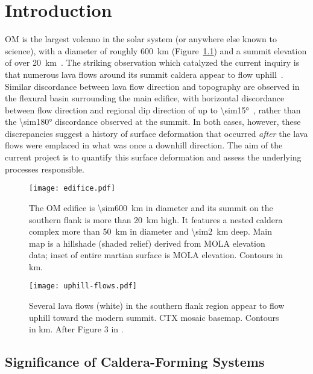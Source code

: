 \chapter{Introduction}
\ac{OM} is the largest volcano in the solar system (or anywhere else known to science), with a diameter of roughly \qty{600}{\km} (Figure~\ref{fig:edifice}) and a summit elevation of over \qty{20}{\km}~\parencite{plescia_morphometric_2004}. The striking observation which catalyzed the current inquiry is that numerous lava flows around its summit caldera appear to flow uphill~\parencite[Figure~\ref{fig:uphill-flows}; after][]{mouginis-mark_late-stage_2019}. Similar discordance between lava flow direction and topography are observed in the flexural basin surrounding the main edifice, with horizontal discordance between flow direction and regional dip direction of up to \ang{\sim15}~\parencite{chadwick_late_2015}, rather than the \ang{\sim180} discordance observed at the summit. In both cases, however, these discrepancies suggest a history of surface deformation that occurred \textit{after} the lava flows were emplaced in what was once a downhill direction. The aim of the current project is to quantify this surface deformation and assess the underlying processes responsible.

\begin{figure}
    \centering
    \texttt{[image: edifice.pdf]}
    \caption[\acl{OM}]{The \ac{OM} edifice is \qty{\sim600}{\km} in diameter and its summit on the southern flank is more than \qty{20}{\km} high. It features a nested caldera complex more than \qty{50}{\km} in diameter and \qty{\sim2}{\km} deep. Main map is a hillshade (shaded relief) derived from \acs{MOLA} elevation data; inset of entire martian surface is \acs{MOLA} elevation. Contours in \unit{\km}.}\label{fig:edifice}
\end{figure}

\begin{figure}
    \centering
    \texttt{[image: uphill-flows.pdf]}
    \caption[Discordant lava flows]{Several lava flows (white) in the southern flank region appear to flow uphill toward the modern summit. \acs{CTX} mosaic basemap. Contours in \unit{\km}. After Figure 3 in \textcite{mouginis-mark_late-stage_2019}.}%
    \label{fig:uphill-flows}
\end{figure}

\section{Significance of Caldera-Forming Systems}

